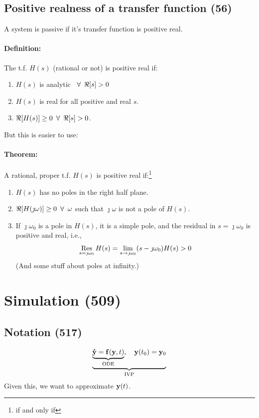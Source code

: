 \documentclass[a4paper, 12pt]{article}
\begin{document}
\subsection{Positive realness of a transfer function (56)}
A system is passive if it's transfer function is positive real.
\paragraph{Definition:} The t.f. \(H(s)\) (rational or not) is positive real if:
\begin{enumerate}
	\item \(H(s)\) is analytic \( \enskip \forall \enskip \Re[s] > 0 \)
	\item \(H(s)\) is real for all positive and real \(s\).
	\item \(\Re[H(s)] \geq 0 \enskip \forall \enskip \Re [s] > 0\).
\end{enumerate}
But this is easier to use:
\paragraph{Theorem:} A rational, proper t.f. \(H(s)\) is positive real if:\footnote{if and only if}
\begin{enumerate}
	\item \( H(s) \) has no poles in the right half plane.
	\item \( \Re[H(\jmath \omega)] \geq 0 \enskip \forall \enskip \omega \) such that \( \jmath \omega \) is not a pole of \( H(s) \).
	\item If \( \jmath \omega_0 \) is a pole in \( H(s) \), it is a simple pole, and the residual in \( s = \jmath \omega_0 \) is positive and real, i.e.,
	\[ \residual_{s = \jmath \omega_0} H(s) = \lim_{s \to \jmath \omega_0} (s - \jmath \omega_0) H(s) > 0 \] (And some stuff about poles at infinity.)
\end{enumerate}

\section{Simulation (509)}
\subsection{Notation (517)}
\begin{equation}\label{eq:ivp}
	\underbrace{
		\underbrace{
			\mathbf{\mathbf{\dot{y}}} = \mathbf{f}(\mathbf{y}, t)
		}_{
			\text{ODE}
		}
		,\quad \mathbf{y}(t_0) = \mathbf{y}_0
	}_{\text{IVP}}
\end{equation}
Given this, we want to approximate \( \mathbf{y}(t) \).
\end{document}
